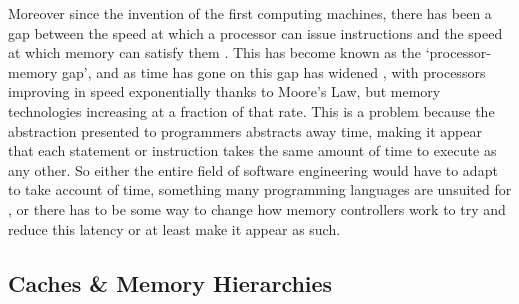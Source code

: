 

Moreover since the invention of the first computing machines, there has been a gap between the speed at which a processor can issue instructions and the speed at which memory can satisfy them \cite{wilkesMemoryGapFuture2001}. This has become known as the `processor-memory gap', and as time has gone on this gap has widened \cite{pattersonComputerOrganizationDesign2018}, with processors improving in speed exponentially thanks to Moore's Law, but memory technologies increasing at a fraction of that rate. This is a problem because the abstraction presented to programmers abstracts away time, making it appear that each statement or instruction takes the same amount of time to execute as any other. So either the entire field of software engineering would have to adapt to take account of time, something many programming languages are unsuited for \cite{furiaModelingTimeComputing2010}, or there has to be some way to change how memory controllers work to try and reduce this latency or at least make it appear as such.


\subsection{Caches \& Memory Hierarchies}


